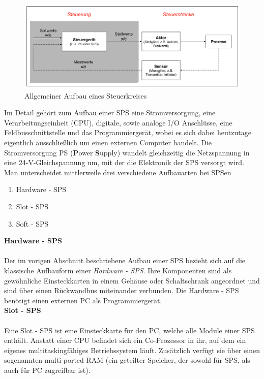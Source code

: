  	\begin{figure}[h!]
  		\centering
      	\includegraphics[width=1\textwidth]{graphics/stateoftheart/Aufbau_Steuerkreis_Selfmade.png}
  		\caption{Allgemeiner Aufbau eines Steuerkreises \cite{mseitz_sps}}
	\end{figure}	
 
 
 Im Detail gehört zum Aufbau einer SPS eine Stromversorgung, eine Verarbeitungseinheit (CPU), digitale, sowie analoge I/O Anschlüsse, eine Feldbusschnittstelle und das Programmiergerät, wobei es sich dabei heutzutage eigentlich ausschließlich um einen externen Computer handelt. Die Stromversorgung PS (\textbf{P}ower \textbf{S}upply) wandelt gleichzeitig die Netzspannung in eine 24-V-Gleichspannung um, mit der die Elektronik der SPS versorgt wird.\\
	
	Man unterscheidet mittlerweile drei verschiedene Aufbauarten bei SPSen
	
	\begin{enumerate}
  		\item Hardware - SPS
  		\item Slot - SPS
  		\item Soft - SPS
	\end{enumerate}

	\textbf{Hardware - SPS}\\\\
	Der im vorigen Abschnitt beschriebene Aufbau einer SPS bezieht sich auf die klassische Aufbauform einer \textit{Hardware - SPS}. Ihre Komponenten sind als gewöhnliche Einsteckkarten in einem Gehäuse oder Schaltschrank angeordnet und sind über einen Rückwandbus miteinander verbunden. Die Hardware - SPS benötigt einen externen PC als Programmiergerät.\\
	
	\textbf{Slot - SPS}\\\\
	Eine Slot - SPS ist eine Einsteckkarte für den PC, welche alle Module einer SPS enthält. Anstatt einer CPU befindet sich ein Co-Prozessor in ihr, auf dem ein eigenes multitaskingfähiges Betriebssystem läuft. Zusätzlich verfügt sie über einen sogenannten multi-ported RAM (ein geteilter Speicher, der sowohl für SPS, als auch für PC zugreifbar ist).\\
	
